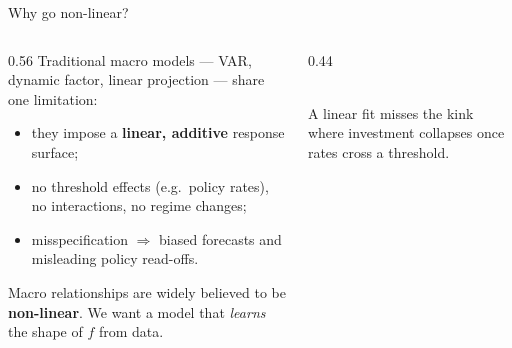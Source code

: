 \documentclass[11pt,aspectratio=169]{beamer}
\begin{document}
\begin{frame}{Why go non-linear?}
  \begin{columns}[T]
    \begin{column}{0.56\textwidth}
      Traditional macro models --- VAR, dynamic factor, linear projection ---
      share one limitation:
      \begin{itemize}
        \item they impose a \textcolor{parIndigo}{\bfseries linear, additive}
              response surface;
        \item no threshold effects (e.g.\ policy rates), no interactions,
              no regime changes;
        \item misspecification $\Rightarrow$ biased forecasts and misleading
              policy read-offs.
      \end{itemize}
      \vspace{2mm}
      Macro relationships are widely believed to be \textbf{non-linear}.
      We want a model that \emph{learns} the shape of $f$ from data.
    \end{column}
    \begin{column}{0.44\textwidth}
      \\[1mm]
      {\scriptsize A linear fit misses the kink where investment collapses once
       rates cross a threshold.}
    \end{column}
  \end{columns}
\end{frame}
\end{document}

